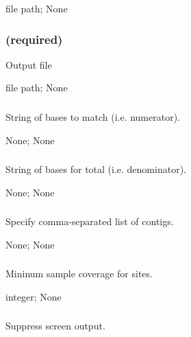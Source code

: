 \documentclass[letterpaper,11pt,english]{sphinxmanual}
\begin{document}
 file path;  None


\subsubsection{ (required)}
\label{\detokenize{prog_desc:id42}}
 Output file

 file path;  None


\subsubsection{}
\label{\detokenize{prog_desc:base-match-basematch}}
 String of bases to match (i.e. numerator).

 None;  None


\subsubsection{}
\label{\detokenize{prog_desc:base-total-basetotal}}
 String of bases for total (i.e. denominator).

 None;  None


\subsubsection{}
\label{\detokenize{prog_desc:id43}}
 Specify comma-separated list of contigs.

 None;  None


\subsubsection{}
\label{\detokenize{prog_desc:mincoverage}}
 Mininum sample coverage for sites.

 integer;  None


\subsubsection{}
\label{\detokenize{prog_desc:id44}}
 Suppress screen output.
\end{document}
